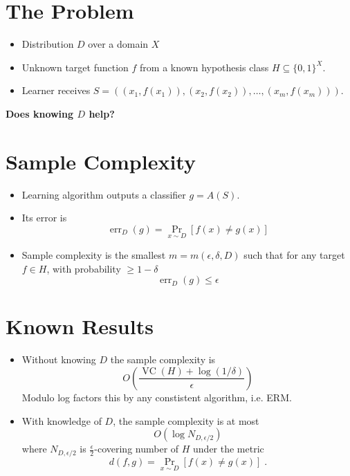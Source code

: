 \documentclass[30pt,landscape]{sciposter}
\DeclareMathOperator{\err}{err}
\DeclareMathOperator{\VC}{VC}
\begin{document}
\setlength{\parindent}{0em}
\setlength{\columnsep}{4cm}
\begin{multicols}{3}

\section*{The Problem}

\begin{itemize}
\item Distribution $D$ over a domain $X$
\item Unknown target function $f$ from a known hypothesis class $H \subseteq \{0,1\}^X$.
\item Learner receives $S = ((x_1, f(x_1)), (x_2, f(x_2)), \dots, (x_m, f(x_m)))$.
\end{itemize}

\vspace{1cm}

\textbf{Does knowing $D$ help?}

\section*{Sample Complexity}

\begin{itemize}
\item Learning algorithm outputs a classifier $g=A(S)$.
\item Its error is
$$
\err_D(g) = \Pr_{x \sim D}[f(x)\neq g(x)]
$$
\item Sample complexity is the smallest $m = m(\epsilon,\delta,D)$ such that for any target $f \in H$,
with probability $\ge 1 - \delta$
$$
\err_D(g) \le \epsilon
$$
\end{itemize}

\section*{Known Results}

\begin{itemize}
\item Without knowing $D$ the sample complexity is
$$
O \left( \frac{\VC(H) + \log(1/\delta)}{\epsilon} \right)
$$
Modulo log factors this by any constistent algorithm, i.e. ERM.

\vspace{1cm}

\item With knowledge of $D$, the sample complexity is at most
$$
O(\log N_{D,\epsilon/2})
$$
where $N_{D,\epsilon/2}$ is $\frac{\epsilon}{2}$-covering number
of $H$ under the metric
$$
d(f,g) = \Pr_{x \sim D}[f(x) \neq g(x)] \; .
$$


\end{itemize}
\end{multicols}
\end{document}
